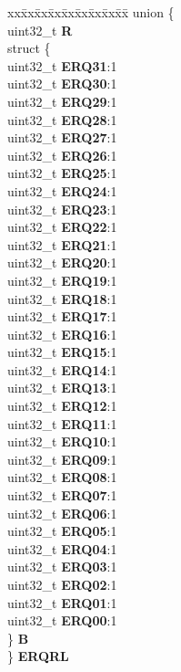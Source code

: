\begin{DoxyCompactItemize}
\begin{tabbing}
\end{tabbing}\item 
\mbox{\label{structEDMA__tag_ae2c10e5eb655677890e89466d980030a}} 
\begin{tabbing}
xx\=xx\=xx\=xx\=xx\=xx\=xx\=xx\=xx\=\kill
union \{\\
\>uint32\_t {\bfseries R}\\
\>struct \{\\
\>\>uint32\_t {\bfseries ERQ31}:1\\
\>\>uint32\_t {\bfseries ERQ30}:1\\
\>\>uint32\_t {\bfseries ERQ29}:1\\
\>\>uint32\_t {\bfseries ERQ28}:1\\
\>\>uint32\_t {\bfseries ERQ27}:1\\
\>\>uint32\_t {\bfseries ERQ26}:1\\
\>\>uint32\_t {\bfseries ERQ25}:1\\
\>\>uint32\_t {\bfseries ERQ24}:1\\
\>\>uint32\_t {\bfseries ERQ23}:1\\
\>\>uint32\_t {\bfseries ERQ22}:1\\
\>\>uint32\_t {\bfseries ERQ21}:1\\
\>\>uint32\_t {\bfseries ERQ20}:1\\
\>\>uint32\_t {\bfseries ERQ19}:1\\
\>\>uint32\_t {\bfseries ERQ18}:1\\
\>\>uint32\_t {\bfseries ERQ17}:1\\
\>\>uint32\_t {\bfseries ERQ16}:1\\
\>\>uint32\_t {\bfseries ERQ15}:1\\
\>\>uint32\_t {\bfseries ERQ14}:1\\
\>\>uint32\_t {\bfseries ERQ13}:1\\
\>\>uint32\_t {\bfseries ERQ12}:1\\
\>\>uint32\_t {\bfseries ERQ11}:1\\
\>\>uint32\_t {\bfseries ERQ10}:1\\
\>\>uint32\_t {\bfseries ERQ09}:1\\
\>\>uint32\_t {\bfseries ERQ08}:1\\
\>\>uint32\_t {\bfseries ERQ07}:1\\
\>\>uint32\_t {\bfseries ERQ06}:1\\
\>\>uint32\_t {\bfseries ERQ05}:1\\
\>\>uint32\_t {\bfseries ERQ04}:1\\
\>\>uint32\_t {\bfseries ERQ03}:1\\
\>\>uint32\_t {\bfseries ERQ02}:1\\
\>\>uint32\_t {\bfseries ERQ01}:1\\
\>\>uint32\_t {\bfseries ERQ00}:1\\
\>\} {\bfseries B}\\
\} {\bfseries ERQRL}\\


\end{tabbing}
\end{DoxyCompactItemize}
